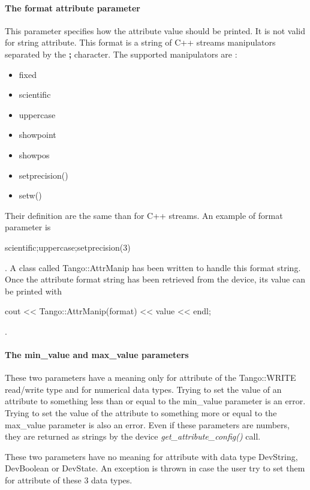 \paragraph{The format attribute parameter}

This parameter specifies how the attribute value should be printed.
It is not valid for string attribute. This format is a string of C++
streams manipulators separated by the \textbf{;} character. The supported
manipulators are :
\begin{itemize}
\item fixed
\item scientific
\item uppercase
\item showpoint
\item showpos
\item setprecision()
\item setw()
\end{itemize}
Their definition are the same than for C++ streams. An example of
format parameter is \begin{center}scientific;uppercase;setprecision(3)\end{center}.
A class called Tango::AttrManip has been written to handle this format
string. Once the attribute format string has been retrieved from the
device, its value can be printed with \begin{center}cout <\textcompwordmark{}<
Tango::AttrManip(format) <\textcompwordmark{}< value <\textcompwordmark{}<
endl;\end{center}.

\paragraph{The min\_value and max\_value
parameters}

These two parameters have a meaning only for attribute of the Tango::WRITE
read/write type and for numerical data types. Trying to set the value
of an attribute to something less than or equal to the min\_value
parameter is an error. Trying to set the value of the attribute to
something more or equal to the max\_value parameter is also an error.
Even if these parameters are numbers, they are returned as strings
by the device \emph{get\_attribute\_config()} call. 

These two parameters have no meaning for attribute with data type
DevString, DevBoolean or DevState. An exception is thrown in case
the user try to set them for attribute of these 3 data types.

